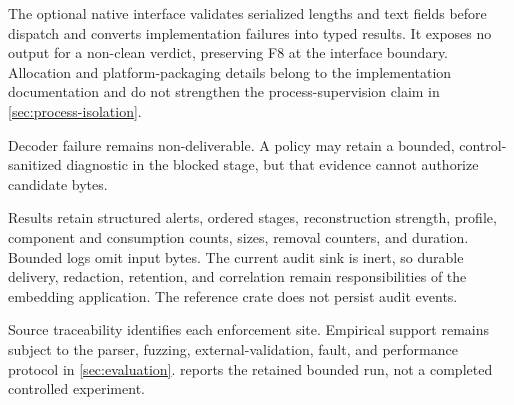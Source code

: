 The optional native interface validates serialized lengths and text fields
before dispatch and converts implementation failures into typed results. It
exposes no output for a non-clean verdict, preserving F8 at the interface
boundary. Allocation and platform-packaging details belong to the implementation
documentation and do not strengthen the process-supervision claim in
\cref{sec:process-isolation}.

Decoder failure remains non-deliverable. A policy may retain a bounded,
control-sanitized diagnostic in the blocked stage, but that evidence cannot
authorize candidate bytes.

Results retain structured alerts, ordered stages, reconstruction strength,
profile, component and consumption counts, sizes, removal counters, and
duration. Bounded logs omit input bytes. The current audit sink is inert, so
durable delivery, redaction, retention, and correlation remain responsibilities
of the embedding application. The reference crate does not persist audit
events.

Source traceability identifies each enforcement site. Empirical support remains
subject to the parser, fuzzing, external-validation, fault, and performance
protocol in \cref{sec:evaluation}.  reports the
retained bounded run, not a completed controlled experiment.
